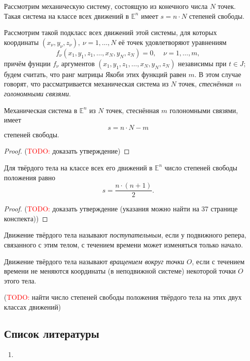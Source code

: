 Рассмотрим механическую систему, состоящую из конечного числа $N$ точек. Такая
система на классе всех движений в $\mathbb{E}^n$ имеет $s = n \cdot N$ степеней
свободы.

Рассмотрим такой подкласс всех движений этой системы, для которых координаты
$(x_\nu, y_\nu, z_\nu),~\nu=1,\dots,N$ её точек удовлетворяют уравнениям
\begin{equation*}
  f_\nu(x_1, y_1, z_1, \dots, x_N, y_N, z_N) = 0, \quad \nu = 1,\dots,m,
\end{equation*}
причём фунции $f_\nu$ аргументов $(x_1,y_1,z_1, \dots, x_N,y_N,z_N)$ независимы
при $t \in J$; будем считать, что ранг матрицы Якоби этих функций равен $m$. В
этом случае говорят, что рассматривается механическая система из $N$ точек,
\textit{стеснённая $m$ голономными связями}.

\begin{theorem}
  Механическая система в $\mathbb{E}^n$ из $N$ точек, стеснённая $m$ голономными
  связями, имеет
  \begin{equation*}
    s = n \cdot N - m
  \end{equation*}
  степеней свободы.
\end{theorem}

\begin{proof}
  (\textcolor{red}{TODO:} доказать утверждение)
\end{proof}

\begin{theorem}
  Для твёрдого тела на классе всех его движений в $\mathbb{E}^n$ число степеней
  свободы положения равно
  \begin{equation*}
    s = \frac{n \cdot (n + 1)}{2}.
  \end{equation*}
\end{theorem}

\begin{proof}
  (\textcolor{red}{TODO:} доказать утверждение (указания можно найти на 37
  странице конспекта))
\end{proof}

\begin{definition}
  Движение твёрдого тела называют \textit{поступательным}, если у подвижного
  репера, связанного с этим телом, с течением времени может изменяться только
  начало.
\end{definition}

\begin{definition}
  Движение твёрдого тела называют \textit{вращением вокруг точки $O$}, если
  с течением времени не меняются координаты (в неподвижной системе) некоторой
  точки $O$ этого тела.
\end{definition}

(\textcolor{red}{TODO:} найти число степеней свободы положения твёрдого тела на
этих двух классах движений)

\subsection{Список литературы}
\begin{enumerate}
  \item \cite{lectures}
\end{enumerate}

